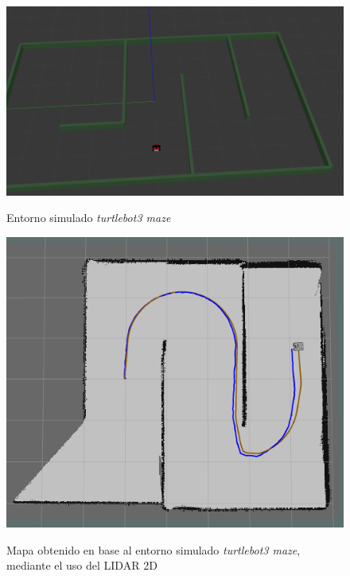 \begin{figure}[!ht]
    \centering
    {\includegraphics[width=\linewidth]{Img/LIDAR2DMapOriginal.png}}
    \caption{Entorno simulado \textit{turtlebot3 maze}}
    \label{fig:lidar2dmaporiginal}
\end{figure}


\begin{figure}[!ht]
    \centering
    {\includegraphics[width=\linewidth]{Img/LIDAR2DMapGenerated.png}}
    \caption{Mapa obtenido en base al entorno simulado \textit{turtlebot3 maze}, mediante el uso del LIDAR 2D}
    \label{fig:lidar2dmapgenerated}
\end{figure}